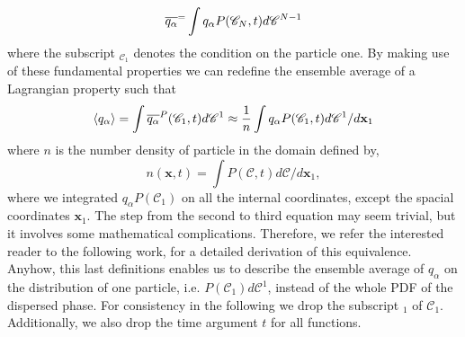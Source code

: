 \begin{equation*}
    \overline{q_\alpha}^{=}\int q_\alpha P(\mathscr{C}_N,t)d\mathscr{C}^{N-1}
\end{equation*}  
where the subscript $_{\mathscr{C}_1}$ denotes the condition on the particle one.
By making use of these fundamental properties we can redefine the ensemble average of a Lagrangian property such that 
\begin{equation*}
    \left<q_\alpha\right>
    =\int \overline{q_\alpha}^{P}(\mathscr{C}_1,t)d\mathscr{C}^{1}
    \approx\frac{1}{n}\int q_\alpha P(\mathscr{C}_1,t)d\mathscr{C}^{1} /d\textbf{x}_1
\end{equation*}  
where $n$ is the number density of particle in the domain defined by,
\begin{equation*}
    n(\textbf{x},t) = \int P(\mathscr{C},t) d\mathscr{C} /d\textbf{x}_1,
\end{equation*}
where we integrated $q_\alpha P(\mathscr{C}_1)$ on all the internal coordinates, except the spacial coordinates $\textbf{x}_1$. 
The step from the second to third equation may seem trivial, but it involves some mathematical complications.
Therefore, we refer the interested reader to the following work, \citet[Chpater 2]{zaepffel2011modelisation} for a detailed derivation of this equivalence.  
Anyhow, this last definitions enables us to describe the ensemble average of $q_\alpha$ on the distribution of one particle, i.e. $P(\mathscr{C}_1)d\mathscr{C}^1$,  instead of the whole PDF of the dispersed phase.  
For consistency in the following we drop the subscript $_1$ of $\mathscr{C}_1$. 
Additionally, we also drop the time argument $t$ for all functions. 

